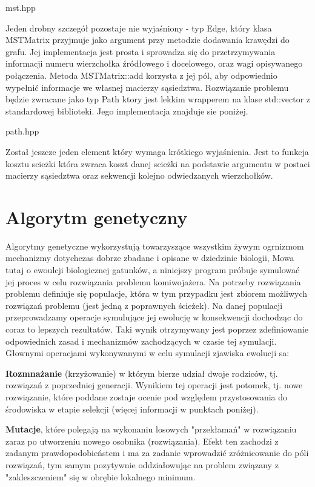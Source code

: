 \documentclass[polish,polish,a4paper]{article}
\begin{document}

{mst.hpp}

Jeden drobny szczegół pozostaje nie wyjaśniony - typ Edge, który klasa MSTMatrix przyjmuje jako argument przy metodzie dodawania krawędzi do grafu.
Jej implementacja jest prosta i sprowadza się do przetrzymywania informacji numeru wierzchołka źródłowego i docelowego, oraz wagi opisywanego połączenia.
Metoda MSTMatrix::add korzysta z jej pól, aby odpowiednio wypełnić informacje we własnej macierzy sąsiedztwa.
Rozwiązanie problemu będzie zwracane jako typ Path ktory jest lekkim wrapperem na klase std::vector z standardowej biblioteki.
Jego implementacja znajduje sie poniżej.


{path.hpp}

Został jeszcze jeden element który wymaga krótkiego wyjaśnienia. Jest to funkcja kosztu scieżki która zwraca koszt danej scieżki na podstawie argumentu w postaci macierzy sąsiedztwa
oraz sekwencji kolejno odwiedzanych wierzchołków.

\section{Algorytm genetyczny}
\par Algorytmy genetyczne wykorzystują towarzyszące wszystkim żywym ogrnizmom mechanizmy dotychczas dobrze zbadane i opisane w dziedzinie biologii,
Mowa tutaj o ewoulcji biologicznej gatunków, a niniejszy program próbuje symulować jej proces w celu rozwiązania problemu komiwojażera.
Na potrzeby rozwiązania problemu definiuje się populacje, która w tym przypadku  jest zbiorem możliwych rozwiązań problemu
(jest jedną z poprawnych ścieżek).
Na danej populacji przeprowadzamy operacje symulujące jej ewolucję w konsekwencji dochodząc do coraz to lepszych rezultatów. Taki wynik otrzymywany jest
poprzez zdefiniowanie odpowiednich zasad i mechanizmów zachodzących w czasie tej symulacji. Głownymi operacjami wykonywanymi w celu symulacji zjawiska
ewolucji sa:

\par \textbf{Rozmnażanie}
(krzyżowanie) w którym bierze udział dwoje rodziców, tj. rozwiązań z poprzedniej generacji. Wynikiem tej operacji jest potomek, tj. nowe rozwiązanie,
które poddane zostaje ocenie pod względem przystosowania do środowiska w etapie selekcji (więcej informacji w punktach poniżej).

\par \textbf{Mutacje},
które polegają na wykonaniu losowych "przekłamań" w rozwiązaniu zaraz po utworzeniu nowego osobnika (rozwiązania).
Efekt ten zachodzi z zadanym prawdopodobieństem i ma za zadanie wprowadzić zróżnicowanie do póli rozwiązań, tym samym pozytywnie oddziałowując na
problem związany z "zakleszczeniem" się w obrębie lokalnego minimum.
\end{document}
